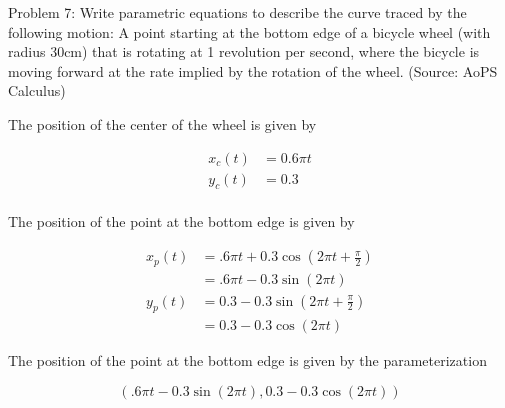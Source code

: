 Problem 7: Write parametric equations to describe the curve traced by the following motion: A point starting at the bottom edge of a bicycle wheel (with radius 30cm) that is rotating at 1 revolution per second, where the bicycle is moving forward at the rate implied by the rotation of the wheel. (Source: AoPS Calculus)

The position of the center of the wheel is given by

\begin{align*}
x_c(t) &= 0.6 \pi t \\
y_c(t) &= 0.3 \\
\end{align*}

The position of the point at the bottom edge is given by

\begin{align*}
x_p(t) &= .6 \pi t + 0.3 \cos (2 \pi t + \frac{\pi}{2}) \\
&= .6 \pi t - 0.3 \sin (2 \pi t) \\
y_p(t) &= 0.3 - 0.3 \sin (2 \pi t + \frac{\pi}{2}) \\
&= 0.3 - 0.3 \cos (2 \pi t)
\end{align*}

The position of the point at the bottom edge is given by the parameterization

$$ \boxed{\left( .6 \pi t - 0.3 \sin (2 \pi t), 0.3 - 0.3 \cos (2 \pi t) \right)} $$
